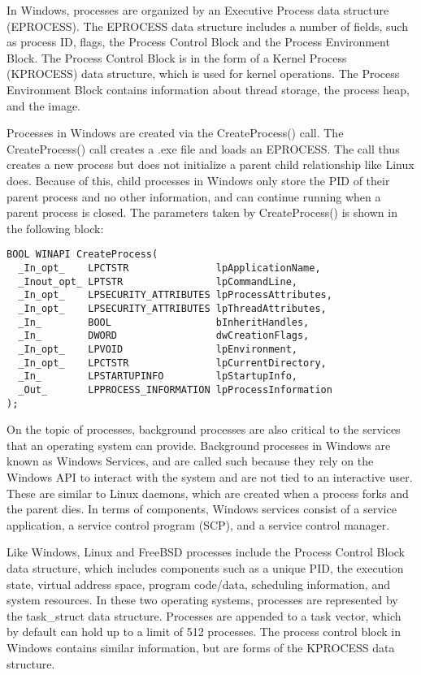 \documentclass[journal, letterpaper, draftclsnofoot, onecolumn, 10pt]{IEEEtran}
\begin{document}
In Windows, processes are organized by an Executive Process data structure (EPROCESS). The EPROCESS data structure includes a number of fields, such as process ID, flags, the Process Control Block and the Process Environment Block. The Process Control Block is in the form of a Kernel Process (KPROCESS) data structure, which is used for kernel operations. The Process Environment Block contains information about thread storage, the process heap, and the image. \cite{mwi1}

Processes in Windows are created via the CreateProcess() call. The CreateProcess() call creates a .exe file and loads an EPROCESS. The call thus creates a new process but does not initialize a parent child relationship like Linux does. Because of this, child processes in Windows only store the PID of their parent process and no other information, and can continue running when a parent process is closed. The parameters taken by CreateProcess() is shown in the following block: \\

\begin{lstlisting}[frame=single, basicstyle=\small]
    BOOL WINAPI CreateProcess(
  _In_opt_    LPCTSTR               lpApplicationName,
  _Inout_opt_ LPTSTR                lpCommandLine,
  _In_opt_    LPSECURITY_ATTRIBUTES lpProcessAttributes,
  _In_opt_    LPSECURITY_ATTRIBUTES lpThreadAttributes,
  _In_        BOOL                  bInheritHandles,
  _In_        DWORD                 dwCreationFlags,
  _In_opt_    LPVOID                lpEnvironment,
  _In_opt_    LPCTSTR               lpCurrentDirectory,
  _In_        LPSTARTUPINFO         lpStartupInfo,
  _Out_       LPPROCESS_INFORMATION lpProcessInformation
);
\end{lstlisting}

On the topic of processes, background processes are also critical to the services that an operating system can provide. Background processes in Windows are known as Windows Services, and are called such because they rely on the Windows API to interact with the system and are not tied to an interactive user. These are similar to Linux daemons, which are created when a process forks and the parent dies. In terms of components, Windows services consist of a service application, a service control program (SCP), and a service control manager.

Like Windows, Linux and FreeBSD processes include the Process Control Block data structure, which includes components such as a unique PID, the execution state, virtual address space, program code/data, scheduling information, and system resources. In these two operating systems, processes are represented by the task\_struct data structure. Processes are appended to a task vector, which by default can hold up to a limit of 512 processes. The process control block in Windows contains similar information, but are forms of the KPROCESS data structure.
\end{document}
